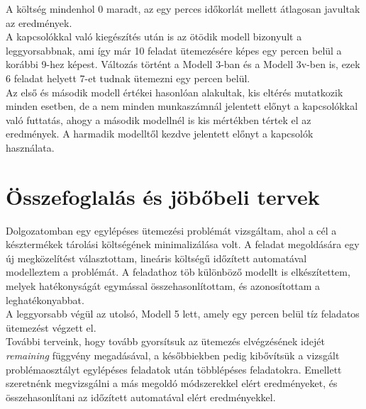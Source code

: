 \documentclass {report}
\begin{document}
      A költség mindenhol 0 maradt, az egy perces időkorlát mellett átlagosan javultak az eredmények.\\
    A kapcsolókkal való kiegészítés után is az ötödik modell bizonyult a leggyorsabbnak, ami így már 10 feladat ütemezésére képes egy percen belül a korábbi 9-hez képest. Változás történt a  Modell 3-ban és a Modell 3v-ben is, ezek 6 feladat helyett 7-et tudnak ütemezni egy percen belül.\\
    Az első és második modell értékei hasonlóan alakultak, kis eltérés mutatkozik minden esetben, de a nem minden munkaszámnál jelentett előnyt a kapcsolókkal való futtatás, ahogy a második modellnél is kis mértékben tértek el az eredmények. A harmadik modelltől kezdve jelentett előnyt a kapcsolók használata. 
   
   

\chapter{Összefoglalás és jöbőbeli tervek}
Dolgozatomban egy egylépéses ütemezési problémát vizsgáltam, ahol a cél a késztermékek tárolási költségének minimalizálása volt. A feladat megoldására egy új megközelítést választottam, lineáris költségű időzített automatával modelleztem a problémát. A feladathoz töb különböző modellt is elkészítettem, melyek hatékonyságát egymással összehasonlítottam, és azonosítottam a leghatékonyabbat.\\
A leggyorsabb végül az utolsó, Modell 5 lett, amely egy percen belül tíz feladatos ütemezést végzett el.\\
További terveink, hogy tovább gyorsítsuk az ütemezés elvégzésének idejét \emph{remaining} függvény megadásával, a későbbiekben pedig kibővítsük a vizsgált problémaosztályt egylépéses feladatok után többlépéses feladatokra. Emellett szeretnénk megvizsgálni a más megoldó módszerekkel elért eredményeket, és összehasonlítani az időzített automatával elért eredményekkel. 


\clearpage
{}


\end{document}
